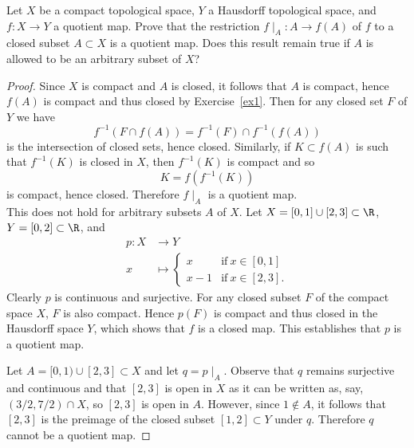 \documentclass[10pt]{amsart}
\begin{document}
\begin{thm}\label{ex4}
  Let $X$ be a compact topological space, $Y$ a Hausdorff topological space, and $f \colon X \rightarrow Y$ a quotient map.
  Prove that the restriction $f \mid_A \colon A \rightarrow f(A)$ of $f$ to a closed subset $A \subset X$ is a quotient map.
  Does this result remain true if $A$ is allowed to be an arbitrary subset of $X$?
  
  \begin{proof}
    Since $X$ is compact and $A$ is closed, it follows that $A$ is compact, hence $f(A)$ is compact and thus closed by Exercise~\ref{ex1}.
    Then for any closed set $F$ of $Y$ we have
    $$f^{-1}(F \cap f(A)) = f^{-1}(F) \cap f^{-1}(f(A))$$
    is the intersection of closed sets, hence closed.
    Similarly, if $K \subset f(A)$ is such that $f^{-1}(K)$ is closed in $X$, then $f^{-1}(K)$ is compact and so 
    $$K = f(f^{-1}(K))$$
    is compact, hence closed.
    Therefore $f\mid_A$ is a quotient map.\\
    
    This does not hold for arbitrary subsets $A$ of $X$.
    Let $X = [0,1] \cup [2,3] \subset \R$, $Y = [0,2] \subset \R$, and 
    \begin{align*}
      p \colon X &\rightarrow Y\\
      x &\mapsto 
      \left\{
      \begin{array}{ll}
        x & \text{if}\ x \in [0,1]\\
        x - 1 & \text{if}\ x \in [2,3].
      \end{array}
      \right.
    \end{align*}
    Clearly $p$ is continuous and surjective.
    For any closed subset $F$ of the compact space $X$, $F$ is also compact.
    Hence $p(F)$ is compact and thus closed in the Hausdorff space $Y$, which shows that $f$ is a closed map.
    This establishes that $p$ is a quotient map.
    
    Let $A = [0,1) \cup [2,3] \subset X$ and let $q = p \mid_A$.
      Observe that $q$ remains surjective and continuous and that $[2,3]$ is open in $X$ as it can be written as, say, $(3/2,7/2) \cap X$, so $[2,3]$ is open in $A$.
      However, since $1 \not \in A$, it follows that $[2,3]$ is the preimage of the closed subset $[1,2] \subset Y$ under $q$.
      Therefore $q$ cannot be a quotient map.
  \end{proof}
\end{thm}
\end{document}
